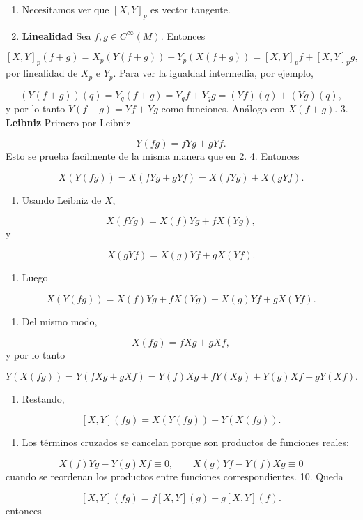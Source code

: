 \begin{bookproof}{}
\begin{enumerate}
\item Necesitamos ver que $[X,Y]_p$ es vector tangente.
\item \textbf{Linealidad} Sea $f,g\in C^\infty(M)$. Entonces
\end{enumerate}
\[
[X,Y]_p(f+g)=X_p(Y(f+g))-Y_p(X(f+g))=[X,Y]_pf+[X,Y]_pg,
\]
por linealidad de $X_p$ e $Y_p$. Para ver la igualdad intermedia, por ejemplo,

\[
(Y(f+g))(q)=Y_q(f+g)=Y_qf+Y_qg=(Yf)(q)+(Yg)(q),
\]
y por lo tanto $Y(f+g)=Yf+Yg$ como funciones. Análogo con $X(f+g)$. 3. \textbf{Leibniz} Primero por Leibniz

\[
Y(fg)=fYg+gYf.
\]
Esto se prueba facilmente de la misma manera que en 2. 4. Entonces

\[
X(Y(fg))=X(fYg+gYf)=X(fYg)+X(gYf).
\]
\begin{enumerate}[start=5]
\item Usando Leibniz de $X$,
\end{enumerate}
\[
X(fYg)=X(f)Yg+fX(Yg),
\]
y

\[
X(gYf)=X(g)Yf+gX(Yf).
\]
\begin{enumerate}[start=6]
\item Luego
\end{enumerate}
\[
X(Y(fg))=X(f)Yg+fX(Yg)+X(g)Yf+gX(Yf).
\]
\begin{enumerate}[start=7]
\item Del mismo modo,
\end{enumerate}
\[
X(fg)=fXg+gXf,
\]
y por lo tanto

\[
Y(X(fg))=Y(fXg+gXf)=Y(f)Xg+fY(Xg)+Y(g)Xf+gY(Xf).
\]
\begin{enumerate}[start=8]
\item Restando,
\end{enumerate}
\[
[X,Y](fg)=X(Y(fg))-Y(X(fg)).
\]
\begin{enumerate}[start=9]
\item Los términos cruzados se cancelan porque son productos de funciones reales:
\end{enumerate}
\[
X(f)Yg-Y(g)Xf\equiv0,\qquad X(g)Yf-Y(f)Xg\equiv0
\]
cuando se reordenan los productos entre funciones correspondientes. 10. Queda

\[
[X,Y](fg)=f[X,Y](g)+g[X,Y](f).
\]
entonces


\end{bookproof}
